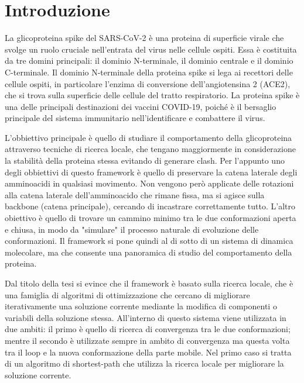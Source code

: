 \chapter*{Introduzione} %
La glicoproteina spike del SARS-CoV-2 è una proteina di superficie virale che svolge un ruolo cruciale nell'entrata del virus nelle cellule ospiti. Essa è costituita da tre domini principali: il dominio N-terminale, il dominio centrale e il dominio C-terminale. Il dominio N-terminale della proteina spike si lega ai recettori delle cellule ospiti, in particolare l'enzima di conversione dell'angiotensina 2 (ACE2), che si trova sulla superficie delle cellule del tratto respiratorio. La proteina spike è una delle principali destinazioni dei vaccini COVID-19, poiché è il bersaglio principale del sistema immunitario nell'identificare e combattere il virus.

L'obbiettivo principale è quello di studiare il comportamento della glicoproteina attraverso tecniche di ricerca locale, che tengano maggiormente in considerazione la stabilità della proteina stessa evitando di generare clash. Per l'appunto uno degli obbiettivi di questo framework è quello di preservare la catena laterale degli amminoacidi in qualsiasi movimento. Non vengono però applicate delle rotazioni alla catena laterale dell'amminoacido che rimane fissa, ma si agisce sulla backbone (catena principale), cercando di incastrare correttamente tutto. 
L'altro obiettivo è quello di trovare un cammino minimo tra le due conformazioni aperta e chiusa, in modo da "simulare" il processo naturale di evoluzione delle conformazioni. Il framework si pone quindi al di sotto di un sistema di dinamica molecolare, ma che consente una panoramica di studio del comportamento della proteina.

Dal titolo della tesi si evince che il framework è basato sulla ricerca locale, che è una famiglia di algoritmi di ottimizzazione che cercano di migliorare iterativamente una soluzione corrente mediante la modifica di componenti o variabili della soluzione stessa. All'interno di questo sistema viene utilizzata in due ambiti: il primo è quello di ricerca di convergenza tra le due conformazioni; mentre il secondo è utilizzate sempre in ambito di convergenza ma questa volta tra il loop e la nuova conformazione della parte mobile. Nel primo caso si tratta di un algoritmo di shortest-path che utilizza la ricerca locale per migliorare la soluzione corrente. 

